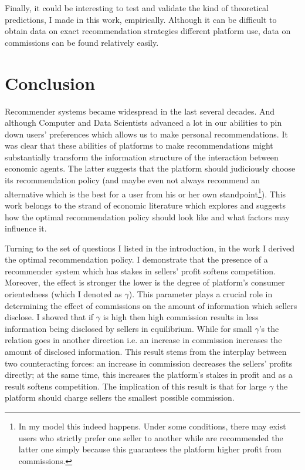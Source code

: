 \documentclass[a4paper]{article}
\begin{document}
	
	
	Finally, it could be interesting to test and validate the kind of theoretical predictions, I made in this work, empirically. Although it can be difficult to obtain data on exact recommendation strategies different platform use, data on commissions can be found relatively easily.
	\section{Conclusion}
	Recommender systems became widespread in the last several decades. And although Computer and Data Scientists advanced a lot in our abilities to pin down users' preferences which allows us to make personal recommendations. It was clear that these abilities of platforms to make recommendations might substantially transform the information structure of the interaction between economic agents. The latter suggests that the platform should judiciously choose its recommendation policy (and maybe even not always recommend an alternative which is the best for a user from his or her own standpoint\footnote{In my model this indeed happens. Under some conditions, there may exist users who strictly prefer one seller to another while are recommended the latter one simply because this guarantees the platform higher profit from commissions.}). This work belongs to the strand of economic literature which explores and suggests how the optimal recommendation policy should look like and what factors may influence it. 
	
	Turning to the set of questions I listed in the introduction, in the work I derived the optimal recommendation policy. I demonstrate that the presence of a recommender system which has stakes in sellers' profit softens competition. Moreover, the effect is stronger the lower is the degree of platform's consumer orientedness (which I denoted as $\gamma$). This parameter plays a crucial role in determining the effect of commissions on the amount of information which sellers disclose. I showed that if $\gamma$ is high then high commission results in less information being disclosed by sellers in equilibrium. While for small $\gamma$'s the relation goes in another direction i.e. an increase in commission increases the amount of disclosed information. This result stems from the interplay between two counteracting forces: an increase in commission decreases the sellers' profits directly; at the same time, this increases the platform's stakes in profit and as a result softens competition. The implication of this result is that for large $\gamma$ the platform should charge sellers the smallest possible commission. 
	
\end{document}
